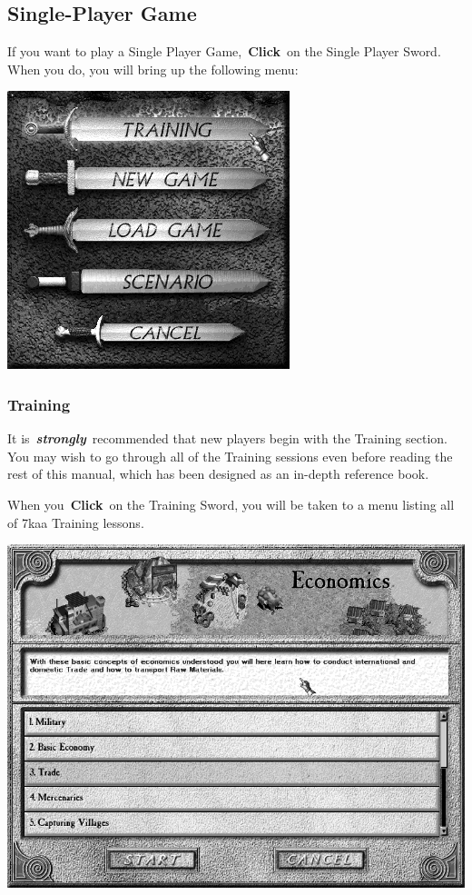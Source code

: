 \subsection{Single-Player Game}

If you want to play a Single Player Game, \textbf{Click} on the Single Player Sword. When you do, you will bring up the following menu: 

	\begin{center}
				\includegraphics[width=0.5\linewidth]{SWsingleplayer}
	\end{center}

\subsubsection{Training}

It is \textbf{\textit{strongly}} recommended that new players begin with the Training section. You may wish to go through all of the Training sessions even before reading the rest of this manual, which has been designed as an in-depth reference book.

When you \textbf{Click} on the Training Sword, you will be taken to a menu listing all of 7kaa Training lessons.

	\begin{center}
		\includegraphics[width=0.7\linewidth]{Itraining}
	\end{center}

